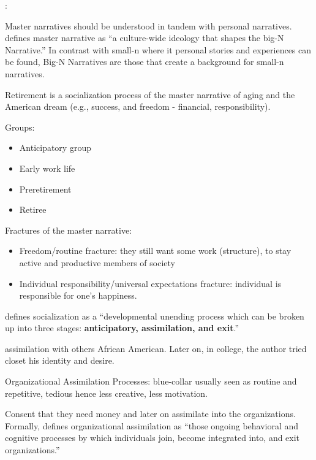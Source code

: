 \documentclass[
]{book}
\providecommand{\tightlist}{%
  \setlength{\itemsep}{0pt}\setlength{\parskip}{0pt}}
\begin{document}
\citep{smith2012}:

Master narratives should be understood in tandem with personal narratives. \citep[pp.209]{tannen2008} defines master
narrative as ``a culture-wide ideology that shapes the big-N Narrative.'' In contrast with small-n where it personal
stories and experiences can be found, Big-N Narratives are those that create a background for small-n narratives.

Retirement is a socialization process of the master narrative of aging and the American dream (e.g., success, and
freedom - financial, responsibility).

Groups:

\begin{itemize}
\tightlist
\item
  Anticipatory group
\item
  Early work life
\item
  Preretirement
\item
  Retiree
\end{itemize}

Fractures of the master narrative:

\begin{itemize}
\tightlist
\item
  Freedom/routine fracture: they still want some work (structure), to stay active and productive members of society
\item
  Individual responsibility/universal expectations fracture: individual is responsible for one's happiness.
\end{itemize}

\citep{ferguson2017}

\citep{jablin_1987} defines socialization as a ``developmental unending process which can be broken up into three stages:
\textbf{anticipatory, assimilation, and exit}.''

assimilation with others African American. Later on, in college, the author tried closet his identity and desire.

\citep{Gibson_2000}

Organizational Assimilation Processes: blue-collar usually seen as routine and repetitive, tedious hence less creative,
less motivation.

Consent that they need money and later on assimilate into the organizations. Formally, \citep[pp.712]{jablin_1987} defines
organizational assimilation as ``those ongoing behavioral and cognitive processes by which individuals join, become
integrated into, and exit organizations.''
\end{document}
